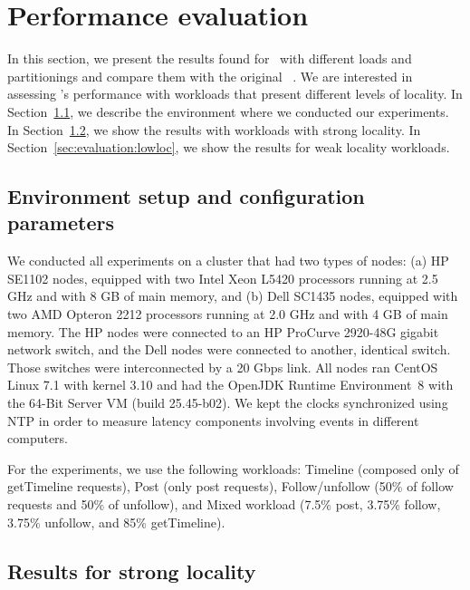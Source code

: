 \section{Performance evaluation}
\label{sec:experiments}


In this section, we present the results found for \appname\ with different loads and partitionings and compare them with the original \ssmr{}~\cite{bezerra2014ssmr}.
We are interested in assessing \dssmr{}'s performance with workloads that present different levels of locality.
In Section~\ref{sec:evaluation:setup}, we describe the environment where we conducted our experiments.
In Section~\ref{sec:evaluation:highloc}, we show the results with workloads with strong locality.
In Section~\ref{sec:evaluation:lowloc}, we show the results for weak locality workloads.

\subsection{Environment setup and configuration parameters}
\label{sec:evaluation:setup}

We conducted all experiments on a cluster that had two types of nodes: (a) HP SE1102 nodes, equipped with two Intel Xeon L5420 processors running at 2.5 GHz and with 8 GB of main memory, and (b) Dell SC1435 nodes, equipped with two AMD Opteron 2212 processors running at 2.0 GHz and with 4 GB of main memory. The HP nodes were connected to an HP ProCurve 2920-48G gigabit network switch, and the Dell nodes were connected to another, identical switch. Those switches were interconnected by a 20 Gbps link.
All nodes ran CentOS Linux 7.1 with kernel 3.10 and had the OpenJDK Runtime Environment~8 with the \mbox{64-Bit} Server VM (build 25.45-b02).
We kept the clocks synchronized using NTP in order to measure latency components involving events in different computers.

For the experiments, we use the following workloads:
Timeline (composed only of getTimeline requests),
Post (only post requests),
Follow/unfollow (50\% of follow requests and 50\% of unfollow), and
Mixed workload (7.5\% post, 3.75\% follow, 3.75\% unfollow, and 85\% getTimeline).

\subsection{Results for strong locality}
\label{sec:evaluation:highloc}


